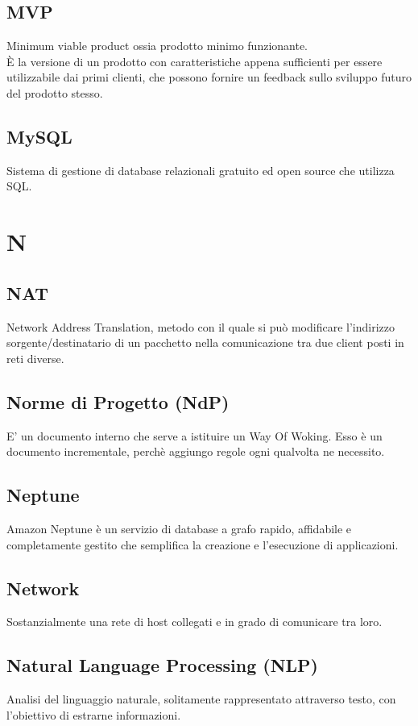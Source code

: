 \documentclass{classes/base}
\begin{document}
        \subsection*{MVP}
        Minimum viable product ossia prodotto minimo funzionante. \\
        È la versione di un prodotto con caratteristiche appena sufficienti per essere utilizzabile dai primi clienti, che possono fornire un feedback sullo sviluppo futuro del prodotto stesso.

        \subsection*{MySQL}
        Sistema di gestione di database relazionali gratuito ed open source che utilizza SQL.
        \newpage  
    \section{N}
        \subsection*{NAT}
        Network Address Translation, metodo con il quale si può modificare l'indirizzo sorgente/destinatario di un pacchetto nella comunicazione tra due client posti in reti diverse.

        \subsection*{Norme di Progetto (NdP)} 
        E' un documento interno che serve a istituire un Way Of Woking. Esso è un documento incrementale, perchè aggiungo regole ogni qualvolta ne necessito.
        
        \subsection*{Neptune}
        Amazon Neptune è un servizio di database a grafo rapido, affidabile e completamente gestito che semplifica la creazione e l'esecuzione di applicazioni.

        \subsection*{Network}
        Sostanzialmente una rete di host collegati e in grado di comunicare tra loro.

        \subsection*{Natural Language Processing (NLP)}
        Analisi del linguaggio naturale, solitamente rappresentato attraverso testo, con l'obiettivo di estrarne informazioni.
\end{document}

